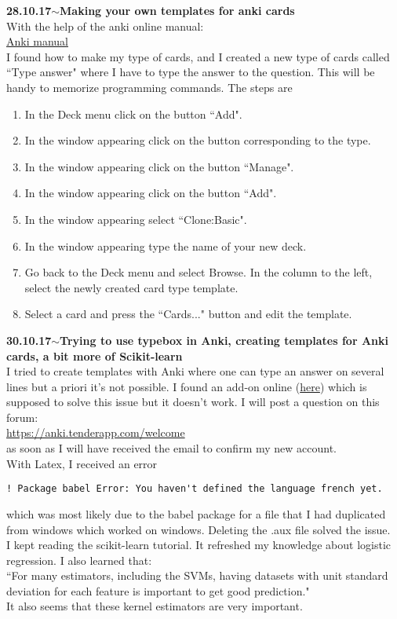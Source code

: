 \documentclass[11pt,a4paper]{article}
\newenvironment{loggentry}[2]%
{\noindent\textbf{#1}\hspace{1cm}$\mathbf{\sim}$\text{ }\textbf{#2}\\}{\vspace{0.5cm}}
\begin{document}
\begin{loggentry}{28.10.17}{Making your own templates for anki cards}
With the help of the anki online manual:\\
\href{https://apps.ankiweb.net/docs/manual.html}{Anki manual}\\
I found how to make my type of cards, and I created a new type of cards called ``Type answer" where I have to type the answer to the question. This will be handy to memorize programming commands. The steps are
\begin{enumerate}[1)]
\item In the Deck menu click on the button ``Add".
\item In the window appearing click on the button corresponding to the type.
\item In the window appearing click on the button ``Manage".
\item In the window appearing click on the button ``Add".
\item In the window appearing select ``Clone:Basic".
\item In the window appearing type the name of your new deck.
\item Go back to the Deck menu and select Browse. In the column to the left, select the newly created card type template.
\item Select a card and press the ``Cards..." button and edit the template.
\end{enumerate}
\end{loggentry}

\begin{loggentry}{30.10.17}{Trying to use typebox in Anki, creating templates for Anki cards, a bit more of Scikit-learn}
I tried to create templates with Anki where one can type an answer on several lines but a priori it's not possible. I found an add-on online (\href{https://ankiweb.net/shared/info/1135197346}{here}) which is supposed to solve this issue but it doesn't work. I will post a question on this forum:\\
\url{https://anki.tenderapp.com/welcome}\\
as soon as I will have received the email to confirm my new account.\\ 
With Latex, I received an error 
\begin{verbatim}
! Package babel Error: You haven't defined the language french yet.
\end{verbatim}
which was most likely due to the babel package for a file that I had duplicated from windows which worked on windows. Deleting the .aux file solved the issue.\\
I kept reading the scikit-learn tutorial. It refreshed my knowledge about logistic regression. I also learned that:\\
``For many estimators, including the SVMs, having datasets with unit standard deviation for each feature is important to get good prediction."\\
It also seems that these kernel estimators are very important.
\end{loggentry}
\end{document}
